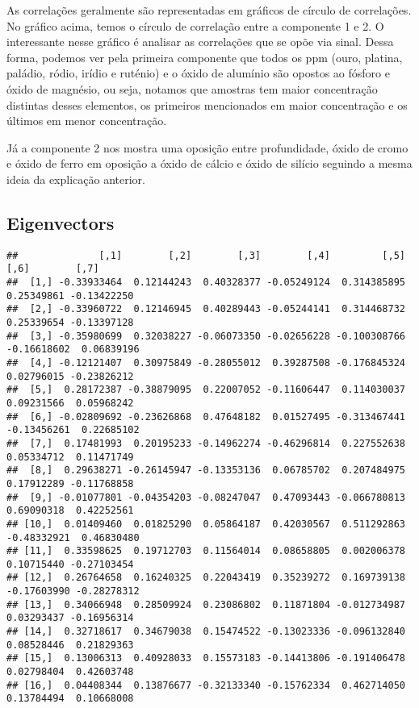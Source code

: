 \documentclass[
]{article}
\begin{document}
As correlações geralmente são representadas em gráficos de círculo de correlações. No gráfico acima, temos o círculo de correlação entre a componente 1 e 2. O interessante nesse gráfico é analisar as correlações que se opõe via sinal. Dessa forma, podemos ver pela primeira componente que todos os ppm (ouro, platina, paládio, ródio, irídio e ruténio) e o óxido de alumínio são opostos ao fósforo e óxido de magnésio, ou seja, notamos que amostras tem maior concentração distintas desses elementos, os primeiros mencionados em maior concentração e os últimos em menor concentração.

Já a componente 2 nos mostra uma oposição entre profundidade, óxido de cromo e óxido de ferro em oposição a óxido de cálcio e óxido de silício seguindo a mesma ideia da explicação anterior.

\hypertarget{eigenvectors}{%
\subsection{Eigenvectors}\label{eigenvectors}}

\begin{verbatim}
##              [,1]        [,2]        [,3]        [,4]         [,5]        [,6]        [,7]
##  [1,] -0.33933464  0.12144243  0.40328377 -0.05249124  0.314385895  0.25349861 -0.13422250
##  [2,] -0.33960722  0.12146945  0.40289443 -0.05244141  0.314468732  0.25339654 -0.13397128
##  [3,] -0.35980699  0.32038227 -0.06073350 -0.02656228 -0.100308766 -0.16618602  0.06839196
##  [4,] -0.12121407  0.30975849 -0.28055012  0.39287508 -0.176845324  0.02796015 -0.23826212
##  [5,]  0.28172387 -0.38879095  0.22007052 -0.11606447  0.114030037  0.09231566  0.05968242
##  [6,] -0.02809692 -0.23626868  0.47648182  0.01527495 -0.313467441 -0.13456261  0.22685102
##  [7,]  0.17481993  0.20195233 -0.14962274 -0.46296814  0.227552638  0.05334712  0.11471749
##  [8,]  0.29638271 -0.26145947 -0.13353136  0.06785702  0.207484975  0.17912289 -0.11768858
##  [9,] -0.01077801 -0.04354203 -0.08247047  0.47093443 -0.066780813  0.69090318  0.42252561
## [10,]  0.01409460  0.01825290  0.05864187  0.42030567  0.511292863 -0.48332921  0.46830480
## [11,]  0.33598625  0.19712703  0.11564014  0.08658805  0.002006378  0.10715440 -0.27103454
## [12,]  0.26764658  0.16240325  0.22043419  0.35239272  0.169739138 -0.17603990 -0.28278312
## [13,]  0.34066948  0.28509924  0.23086802  0.11871804 -0.012734987  0.03293437 -0.16956314
## [14,]  0.32718617  0.34679038  0.15474522 -0.13023336 -0.096132840  0.08528446  0.21829363
## [15,]  0.13006313  0.40928033  0.15573183 -0.14413806 -0.191406478  0.02798404  0.42603748
## [16,]  0.04408344  0.13876677 -0.32133340 -0.15762334  0.462714050  0.13784494  0.10668008
\end{verbatim}
\end{document}
